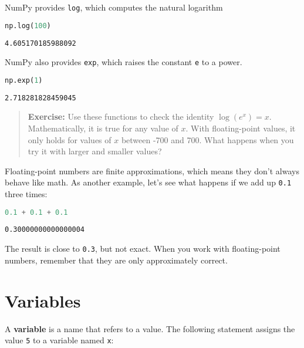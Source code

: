 \documentclass[
]{book}
\newcommand{\passthrough}[1]{#1}
\begin{document}
NumPy provides \passthrough{\lstinline!log!}, which computes the natural
logarithm

\begin{lstlisting}[language=Python]
np.log(100)
\end{lstlisting}

\begin{lstlisting}
4.605170185988092
\end{lstlisting}

NumPy also provides \passthrough{\lstinline!exp!}, which raises the
constant \passthrough{\lstinline!e!} to a power.

\begin{lstlisting}[language=Python]
np.exp(1)
\end{lstlisting}

\begin{lstlisting}
2.718281828459045
\end{lstlisting}

\begin{quote}
\textbf{Exercise:} Use these functions to check the identity
\(\log(e^x) = x\). Mathematically, it is true for any value of \(x\).
With floating-point values, it only holds for values of \(x\) between
-700 and 700. What happens when you try it with larger and smaller
values?
\end{quote}

Floating-point numbers are finite approximations, which means they don't
always behave like math. As another example, let's see what happens if
we add up \passthrough{\lstinline!0.1!} three times:

\begin{lstlisting}[language=Python]
0.1 + 0.1 + 0.1
\end{lstlisting}

\begin{lstlisting}
0.30000000000000004
\end{lstlisting}

The result is close to \passthrough{\lstinline!0.3!}, but not exact.
When you work with floating-point numbers, remember that they are only
approximately correct.

\section{Variables}\label{variables}

A \textbf{variable} is a name that refers to a value. The following
statement assigns the value \passthrough{\lstinline!5!} to a variable
named \passthrough{\lstinline!x!}:
\end{document}

